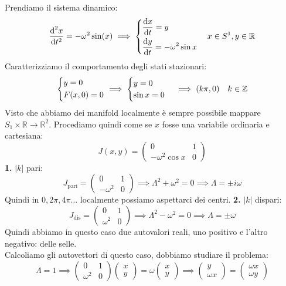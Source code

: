 \begin{exmp}
    Prendiamo il sistema dinamico:
    \[
	\frac{\text{d} ^2x}{\text{d} t^2} = - \omega^2\sin (x) \implies  
	\begin{dcases}
	    \frac{\text{d} x}{\text{d} t} = y \\
	    \frac{\text{d} y}{\text{d} t} = -\omega^2\sin x
	\end{dcases}
    \quad x \in S^1, y \in \mathbb{R}
    \] 
    Caratterizziamo il comportamento degli stati stazionari:
    \[\begin{dcases}
        y = 0\\
	F(x, 0)=0
    \end{dcases}
    \implies
    \begin{cases}
        y=0\\
	\sin x = 0
    \end{cases}
    \implies 
    (k\pi, 0)
    \quad 
    k \in \mathbb{Z}
\] 
Visto che abbiamo dei manifold localmente è sempre possibile mappare $S_1\times \mathbb{R} \to \mathbb{R}^2$. Procediamo quindi come se $x$ fosse una variabile ordinaria e cartesiana:
\[
    J(x, y) = \begin{pmatrix} 0 & 1 \\ - \omega^2\cos x & 0 \end{pmatrix} 
\] 
\textbf{1.} $\left|k\right|$ pari:
\[
    J_{\text{pari}} = \begin{pmatrix} 0 & 1 \\ -\omega^2 & 0 \end{pmatrix} \implies  \Lambda^2 + \omega^2 = 0 \implies  \Lambda  = \pm i \omega
\] 
Quindi in $0, 2\pi, 4\pi\ldots$ localmente possiamo aspettarci dei centri.
\textbf{2.} $\left|k\right|$ dispari:
\[
    J_{\text{dis}} = \begin{pmatrix} 0 & 1 \\ \omega^2 & 0 \end{pmatrix} \implies  \Lambda^2 - \omega^2 = 0 \implies  \Lambda  = \pm  \omega
\] 
Quindi abbiamo in questo caso due autovalori reali, uno positivo e l'altro negativo: delle selle.\\
Calcoliamo gli autovettori di questo caso, dobbiamo studiare il problema:
\[
    \Lambda  = 1 \implies  \begin{pmatrix} 0 & 1 \\ \omega^2 & 0 \end{pmatrix} \begin{pmatrix} x \\ y \end{pmatrix} = \omega\begin{pmatrix} x \\ y \end{pmatrix} \implies  \begin{pmatrix} y \\ \omega x \end{pmatrix} = \begin{pmatrix} \omega x \\ \omega y \end{pmatrix} 
\]
\end{exmp}

